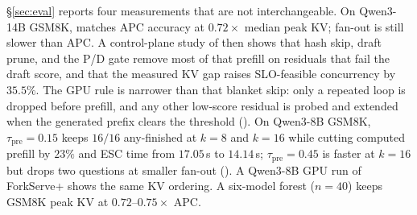 \S\ref{sec:eval} reports four measurements that are not interchangeable.
On Qwen3-14B GSM8K, \sys matches APC accuracy at $0.72\times$ median peak KV; fan-out is still slower than APC.
A control-plane study of \app then shows that hash skip, draft prune, and the P/D gate remove most of that prefill on residuals that fail the draft score, and that the measured KV gap raises SLO-feasible concurrency by $35.5\%$.
The GPU rule is narrower than that blanket skip: only a repeated loop is dropped before prefill, and any other low-score residual is probed and extended when the generated prefix clears the threshold ().
On Qwen3-8B GSM8K, $\tau_{\mathrm{pre}}{=}0.15$ keeps $16/16$ any-finished at $k{=}8$ and $k{=}16$ while cutting computed prefill by $23\%$ and ESC time from $17.05$\,s to $14.14$\,s; $\tau_{\mathrm{pre}}{=}0.45$ is faster at $k{=}16$ but drops two questions at smaller fan-out ().
A Qwen3-8B GPU run of ForkServe+ shows the same KV ordering.
A six-model forest ($n{=}40$) keeps GSM8K peak KV at $0.72$--$0.75\times$ APC.
